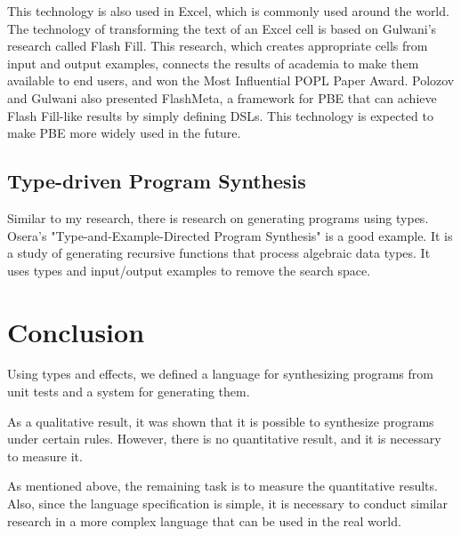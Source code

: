 \documentclass[12pt, a4paper, titlepage]{report}
\begin{document}
    This technology is also used in Excel, which is commonly used around the world.
    The technology of transforming the text of an Excel cell is based on Gulwani's research called Flash Fill\cite{gulwani:2011}.
    This research, which creates appropriate cells from input and output examples, connects the results of academia to make them available to end users, and won the Most Influential POPL Paper Award.
    Polozov and Gulwani also presented FlashMeta\cite{polozov:2015}, a framework for PBE that can achieve Flash Fill-like results by simply defining DSLs.
    This technology is expected to make PBE more widely used in the future.

  \section{Type-driven Program Synthesis}
    Similar to my research, there is research on generating programs using types.
    Osera's "Type-and-Example-Directed Program Synthesis"\cite{osera:2015} is a good example.
    It is a study of generating recursive functions that process algebraic data types.
    It uses types and input/output examples to remove the search space.

\chapter{Conclusion}\label{chapter:conclusion}
Using types and effects, we defined a language for synthesizing programs from unit tests and a system for generating them.

As a qualitative result, it was shown that it is possible to synthesize programs under certain rules.
However, there is no quantitative result, and it is necessary to measure it.

As mentioned above, the remaining task is to measure the quantitative results. Also, since the language specification is simple, it is necessary to conduct similar research in a more complex language that can be used in the real world.



\end{document}
